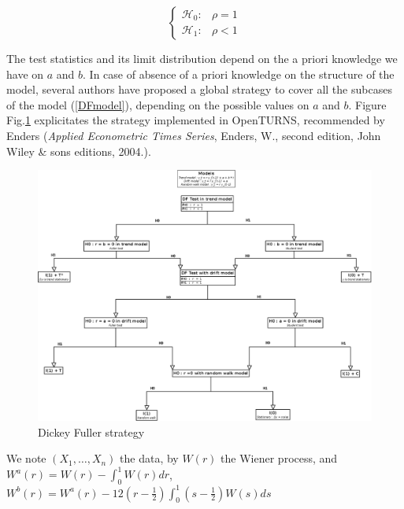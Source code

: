 \begin{equation}\label{DFFormalHypothesis}
  \left\{
  \begin{array}{lr}
    \mathcal{H}_0 : & \rho = 1 \\
    \mathcal{H}_1 : & \rho < 1
  \end{array}
  \right.
\end{equation}

The test statistics and its limit distribution depend on the a priori knowledge we have on $a$ and $b$. In case of absence of a priori knowledge on the structure of the model, several authors have proposed a global strategy to cover all the subcases of the  model (\ref{DFmodel}), depending on the possible values on $a$ and $b$. Figure Fig.\ref{df_strategy} explicitates the strategy  implemented in OpenTURNS,  recommended by Enders (\emph{Applied Econometric Times Series}, Enders, W., second edition, John Wiley \& sons editions, 2004.).



\begin{figure}[H]
  \begin{center}
    \includegraphics[width=16cm]{Figures/df_strategy.png}
    \caption{Dickey Fuller strategy}
    \label{df_strategy}
  \end{center}
\end{figure}

We note $(X_1, \hdots, X_n)$ the data, by $W(r)$ the Wiener process, and $W^{a}(r) = W(r) - \int_{0}^{1} W(r) dr$, $W^{b}(r) = W^{a}(r) - 12 \left(r - \frac{1}{2} \right) \int_{0}^{1} \left(s - \frac{1}{2} \right) W(s) ds$\\

